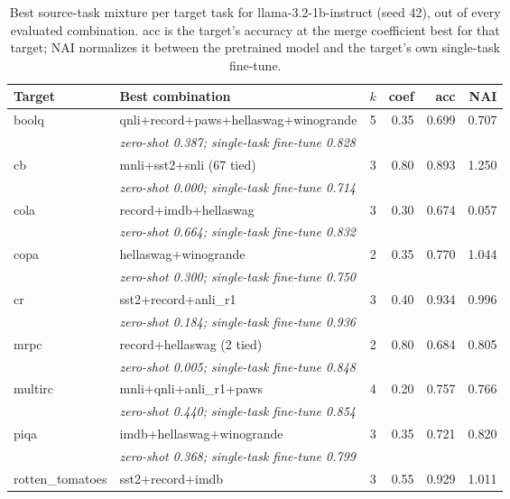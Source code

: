 \begin{table}[t]
  \centering
  \caption{Best source-task mixture per target task for llama-3.2-1b-instruct (seed 42), out of every evaluated combination. acc is the target's accuracy at the merge coefficient best for that target; NAI normalizes it between the pretrained model and the target's own single-task fine-tune.}
  \label{tab:target-best-per-target}
  \begin{tabular}{llrrrr}
    \toprule
    Target & Best combination & $k$ & coef & acc & NAI \\
    \midrule
    boolq & qnli+record+paws+hellaswag+winogrande & 5 & 0.35 & 0.699 & 0.707 \\
    & \multicolumn{5}{l}{\textit{zero-shot 0.387; single-task fine-tune 0.828}} \\
    \addlinespace
    cb & mnli+sst2+snli (67 tied) & 3 & 0.80 & 0.893 & 1.250 \\
    & \multicolumn{5}{l}{\textit{zero-shot 0.000; single-task fine-tune 0.714}} \\
    \addlinespace
    cola & record+imdb+hellaswag & 3 & 0.30 & 0.674 & 0.057 \\
    & \multicolumn{5}{l}{\textit{zero-shot 0.664; single-task fine-tune 0.832}} \\
    \addlinespace
    copa & hellaswag+winogrande & 2 & 0.35 & 0.770 & 1.044 \\
    & \multicolumn{5}{l}{\textit{zero-shot 0.300; single-task fine-tune 0.750}} \\
    \addlinespace
    cr & sst2+record+anli\_r1 & 3 & 0.40 & 0.934 & 0.996 \\
    & \multicolumn{5}{l}{\textit{zero-shot 0.184; single-task fine-tune 0.936}} \\
    \addlinespace
    mrpc & record+hellaswag (2 tied) & 2 & 0.80 & 0.684 & 0.805 \\
    & \multicolumn{5}{l}{\textit{zero-shot 0.005; single-task fine-tune 0.848}} \\
    \addlinespace
    multirc & mnli+qnli+anli\_r1+paws & 4 & 0.20 & 0.757 & 0.766 \\
    & \multicolumn{5}{l}{\textit{zero-shot 0.440; single-task fine-tune 0.854}} \\
    \addlinespace
    piqa & imdb+hellaswag+winogrande & 3 & 0.35 & 0.721 & 0.820 \\
    & \multicolumn{5}{l}{\textit{zero-shot 0.368; single-task fine-tune 0.799}} \\
    \addlinespace
    rotten\_tomatoes & sst2+record+imdb & 3 & 0.55 & 0.929 & 1.011 \\

\end{tabular}
\end{table}

